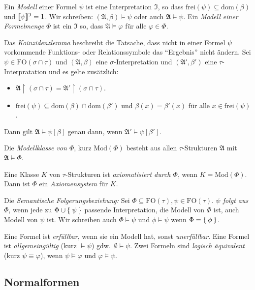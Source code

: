 \documentclass[a4paper,parskip=half*,DIV=15,fontsize=11pt]{scrartcl}
\DeclarePairedDelimiter\interpret{\llbracket}{\rrbracket}
\newcommand{\J}{\mathfrak{I}}
\newcommand{\A}{\mathfrak{A}}
\newcommand{\FO}{\mathrm{FO}}
\newcommand{\dom}{\mathrm{dom}}
\newcommand{\frei}{\mathrm{frei}}
\newcommand{\Mod}{\mathrm{Mod}}
\begin{document}
Ein \emph{Modell} einer Formel $\psi$ ist eine Interpretation $\J$, so dass $\frei(\psi) \subseteq \dom(\beta)$ und $\interpret{\psi}^\J = 1$. Wir schreiben: $(\A, \beta) \models \psi$ oder auch $\A \models \psi$. Ein \emph{Modell einer Formelmenge} $\Phi$ ist ein $\J$ so, dass $\A \models \varphi$ für alle $\varphi \in \Phi$.

Das \emph{Koinzidenzlemma} beschreibt die Tatsache, dass nicht in einer Formel $\psi$ vorkommende Funktions- oder Relationssymbole das ``Ergebnis'' nicht ändern. Sei $\psi \in \FO(\sigma \cap \tau)$ und $(\A, \beta)$ eine $\sigma$-Interpretation und $(\A', \beta')$ eine $\tau$-Interpratation und es gelte zusätzlich:
\begin{itemize}
    \item $\A \upharpoonright (\sigma \cap \tau) = \A' \upharpoonright (\sigma \cap \tau)$.
    \item $\frei(\psi) \subseteq \dom(\beta) \cap \dom(\beta')$ und $\beta(x) = \beta'(x)$ für alle $x \in \frei(\psi)$.
\end{itemize}

Dann gilt $\A \models \psi[\beta]$ genau dann, wenn $\A' \models \psi[\beta']$.

Die \emph{Modellklasse von $\Phi$}, kurz $\Mod(\Phi)$ besteht aus allen $\tau$-Strukturen $\A$ mit $\A \models \Phi$.

Eine Klasse $K$ von $\tau$-Strukturen ist \emph{axiomatisiert durch $\Phi$}, wenn $K = \Mod(\Phi)$. Dann ist $\Phi$ ein \emph{Axiomensystem} für $K$.

Die \emph{Semantische Folgerungsbeziehung:} Sei $\Phi \subseteq \FO(\tau), \psi \in \FO(\tau)$. \emph{$\psi$ folgt aus $\Phi$}, wenn jede zu $\Phi \cup \Set{\psi}$ passende Interpretation, die Modell von $\Phi$ ist, auch Modell von $\psi$ ist. Wir schreiben auch $\Phi \models \psi$ und $\phi \models \psi$ wenn $\Phi = \Set{\phi}$.

Eine Formel ist \emph{erfüllbar}, wenn sie ein Modell hat, sonst \emph{unerfüllbar}. Eine Formel ist \emph{allgemeingültig} (kurz $\models \psi$) gdw.\ $\emptyset \models \psi$. Zwei Formeln sind \emph{logisch äquivalent} (kurz $\psi \equiv \varphi$), wenn $\psi \models \varphi$ und $\varphi \models \psi$.


\subsection{Normalformen}
\end{document}
